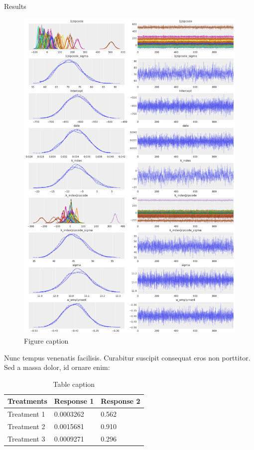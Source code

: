 \documentclass[final]{beamer}
\newlength{\onecolwid}
\newlength{\twocolwid}
\begin{document}
\begin{frame}[t]
\begin{columns}[t]
\begin{column}{\twocolwid}
\begin{columns}[t,totalwidth=\twocolwid]
\begin{column}{\onecolwid}
\begin{block}{Results}
						\begin{figure}
							\includegraphics[width=0.8\linewidth]{results.png}
							\caption{Figure caption}
						\end{figure}

						Nunc tempus venenatis facilisis. Curabitur suscipit consequat eros non porttitor. Sed a massa dolor, id ornare enim:

						\begin{table}
							\vspace{2ex}
							\begin{tabular}{l l l}
								\toprule
								\textbf{Treatments} & \textbf{Response 1} & \textbf{Response 2} \\
								\midrule
								Treatment 1         & 0.0003262           & 0.562               \\
								Treatment 2         & 0.0015681           & 0.910               \\
								Treatment 3         & 0.0009271           & 0.296               \\
								\bottomrule
							\end{tabular}
							\caption{Table caption}
						\end{table}


\end{block}
\end{column}
\end{columns}
\end{column}
\end{columns}
\end{frame}
\end{document}
